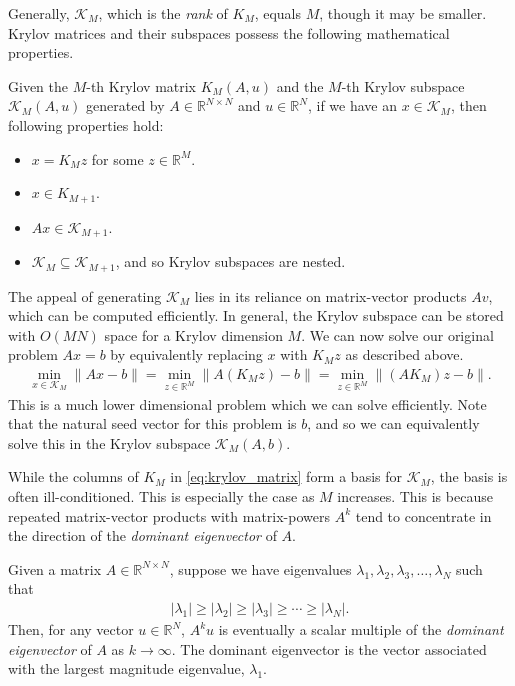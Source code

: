 Generally, $\mathcal{K}_M$, which is the \textit{rank} of $K_M$, equals $M$, though it may be smaller. Krylov matrices and their subspaces possess the following mathematical properties.
\begin{definition}
    Given the $M$-th Krylov matrix $K_M(A, u)$ and the $M$-th Krylov subspace $\mathcal{K}_M(A, u)$ generated by $A \in \mathbb{R}^{N \times N}$ and $u \in \mathbb{R}^N$, if we have an $x \in \mathcal{K}_M$, then following properties hold:
    \begin{itemize}
        \item $x = K_M z$ for some $z \in \mathbb{R}^M$.
        \item $x \in K_{M+1}$.
        \item $A x \in \mathcal{K}_{M+1}$.
        \item $\mathcal{K}_M \subseteq \mathcal{K}_{M+1}$, and so Krylov subspaces are nested.
    \end{itemize}
    \label{definition:krylov_properties}
\end{definition}

The appeal of generating $\mathcal{K}_M$ lies in its reliance on matrix-vector products $A v$, which can be computed efficiently. In general, the Krylov subspace can be stored with $O(M N)$ space for a Krylov dimension $M$. We can now solve our original problem $Ax = b$ by equivalently replacing $x$ with $K_M z$ as described above.
\begin{align}
    \min_{x \in \mathcal{K}_M} \| A x - b \| = \min_{z \in \mathbb{R}^M} \| A (K_M z) - b \| = \min_{z \in \mathbb{R}^M} \| (A K_M) z - b \|.
    \label{equation:krylov_subspace_problem}
\end{align}
This is a much lower dimensional problem which we can solve efficiently.
Note that the natural seed vector for this problem is $b$, and so we can equivalently solve this in the Krylov subspace $\mathcal{K}_M(A, b)$.

While the columns of $K_M$ in \cref{eq:krylov_matrix} form a basis for $\mathcal{K}_M$, the basis is often ill-conditioned. This is especially the case as $M$ increases. This is because repeated matrix-vector products with matrix-powers $A^k$ tend to concentrate in the direction of the \textit{dominant eigenvector} of $A$.
\begin{definition}
    Given a matrix $A \in \mathbb{R}^{N \times N}$, suppose we have eigenvalues $\lambda_1, \lambda_2, \lambda_3, \ldots, \lambda_N$ such that 
    \begin{align}
        |\lambda_1| \geq |\lambda_2| \geq |\lambda_3| \geq \cdots \geq |\lambda_N|.
    \end{align}
    Then, for any vector $u \in \mathbb{R}^N$, $A^k u$ is eventually a scalar multiple of the \textit{dominant eigenvector} of $A$ as $k \to \infty$. The dominant eigenvector is the vector associated with the largest magnitude eigenvalue, $\lambda_1$.
\end{definition}

